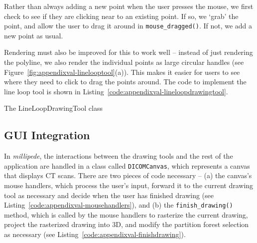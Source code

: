 Rather than always adding a new point when the user presses the mouse, we first check to see if they are clicking near to an existing point. If so, we `grab' the point, and allow the user to drag it around in \texttt{mouse_dragged()}. If not, we add a new point as usual.

Rendering must also be improved for this to work well -- instead of just rendering the polyline, we also render the individual points as large circular handles (see Figure~\ref{fig:appendixval-linelooptool}(a)). This makes it easier for users to see where they need to click to drag the points around. The code to implement the line loop tool is shown in Listing~\ref{code:appendixval-lineloopdrawingtool}.

\begin{stulisting}[p]
\caption{The LineLoopDrawingTool class}
\label{code:appendixval-lineloopdrawingtool}

\end{stulisting}

\newpage

\subsection{GUI Integration}
\label{subsec:appendixval-integration}

In \emph{millipede}, the interactions between the drawing tools and the rest of the application are handled in a class called \texttt{DICOMCanvas}, which represents a canvas that displays CT scans. There are two pieces of code necessary -- (a) the canvas's mouse handlers, which process the user's input, forward it to the current drawing tool as necessary and decide when the user has finished drawing (see Listing~\ref{code:appendixval-mousehandlers}), and (b) the \texttt{finish_drawing()} method, which is called by the mouse handlers to rasterize the current drawing, project the rasterized drawing into 3D, and modify the partition forest selection as necessary (see Listing~\ref{code:appendixval-finishdrawing}).

